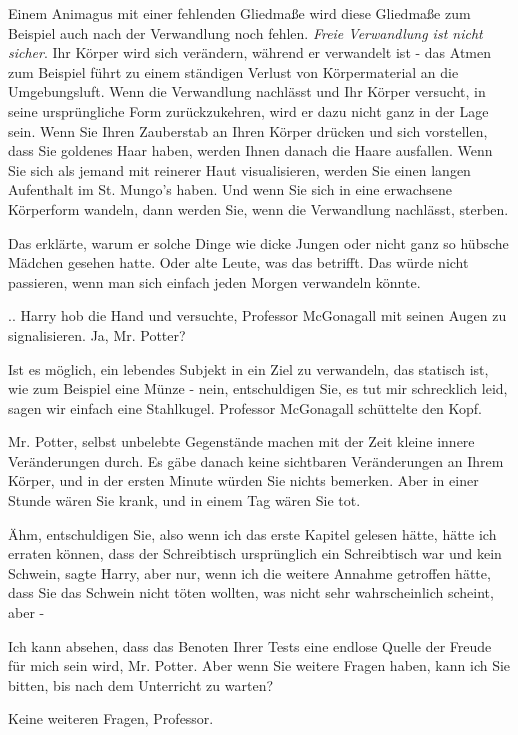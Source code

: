 Einem Animagus mit einer fehlenden Gliedmaße wird diese Gliedmaße zum Beispiel
auch nach der Verwandlung noch fehlen. \emph{Freie Verwandlung ist nicht
sicher}. Ihr Körper wird sich verändern, während er verwandelt ist - das Atmen
zum Beispiel führt zu einem ständigen Verlust von Körpermaterial an die
Umgebungsluft. Wenn die Verwandlung nachlässt und Ihr Körper versucht, in seine
ursprüngliche Form zurückzukehren, wird er dazu nicht ganz in der Lage sein.
Wenn Sie Ihren Zauberstab an Ihren Körper drücken und sich vorstellen, dass Sie
goldenes Haar haben, werden Ihnen danach die Haare ausfallen. Wenn Sie sich als
jemand mit reinerer Haut visualisieren, werden Sie einen langen Aufenthalt im
St. Mungo's haben. Und wenn Sie sich in eine erwachsene Körperform wandeln, dann
werden Sie, wenn die Verwandlung nachlässt, sterben.\grqq{}

Das erklärte, warum er solche Dinge wie dicke Jungen oder nicht ganz so hübsche
Mädchen gesehen hatte. Oder alte Leute, was das betrifft. Das würde nicht
passieren, wenn man sich einfach jeden Morgen verwandeln könnte.

.. Harry hob die Hand und versuchte, Professor McGonagall mit seinen Augen zu
signalisieren. \glqq{}Ja, Mr. Potter?\grqq{}

\glqq{}Ist es möglich, ein lebendes Subjekt in ein Ziel zu verwandeln, das
statisch ist, wie zum Beispiel eine Münze - nein, entschuldigen Sie, es tut mir
schrecklich leid, sagen wir einfach eine Stahlkugel.\grqq{} Professor McGonagall
schüttelte den Kopf.

\glqq{}Mr. Potter, selbst unbelebte Gegenstände machen mit der Zeit kleine innere
Veränderungen durch. Es gäbe danach keine sichtbaren Veränderungen an Ihrem
Körper, und in der ersten Minute würden Sie nichts bemerken. Aber in einer
Stunde wären Sie krank, und in einem Tag wären Sie tot.\grqq{}

\glqq{}Ähm, entschuldigen Sie, also wenn ich das erste Kapitel gelesen hätte,
hätte ich erraten können, dass der Schreibtisch ursprünglich ein Schreibtisch
war und kein Schwein\grqq{}, sagte Harry, \glqq{}aber nur, wenn ich die weitere
Annahme getroffen hätte, dass Sie das Schwein nicht töten wollten, was nicht
sehr wahrscheinlich scheint, aber -\grqq{}

\glqq{}Ich kann absehen, dass das Benoten Ihrer Tests eine endlose Quelle der
Freude für mich sein wird, Mr. Potter. Aber wenn Sie weitere Fragen haben, kann
ich Sie bitten, bis nach dem Unterricht zu warten?\grqq{}

\glqq{}Keine weiteren Fragen, Professor.\grqq{}

